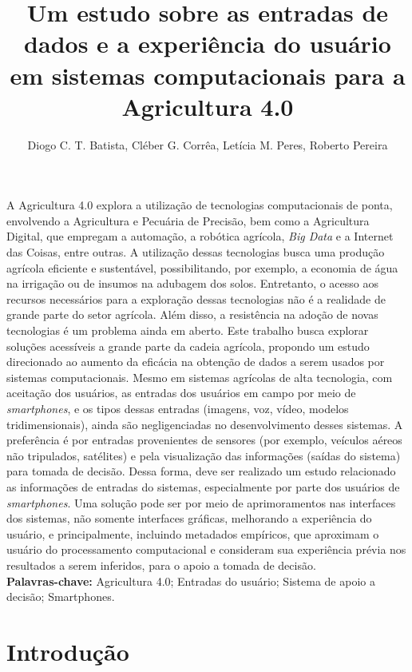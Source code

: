 \documentclass[12pt]{article}
\title{Um estudo sobre as entradas de dados e a experiência do usuário em sistemas computacionais para a Agricultura 4.0}
\author{Diogo C. T. Batista\inst{1}, Cléber G. Corrêa\inst{1}, Letícia M. Peres\inst{2}, Roberto Pereira\inst{2}}
\begin{document}
 

\maketitle
     
\begin{resumo} 
A Agricultura 4.0 explora a utilização de tecnologias computacionais de ponta, envolvendo a Agricultura e Pecuária de Precisão, bem como a Agricultura Digital, que empregam a automação, a robótica agrícola, \textit{Big Data} e a Internet das Coisas, entre outras. A utilização dessas tecnologias busca uma produção agrícola eficiente e sustentável, possibilitando, por exemplo, a economia de água na irrigação ou de insumos na adubagem dos solos. Entretanto, o acesso aos recursos necessários para a exploração dessas tecnologias não é a realidade de grande parte do setor agrícola. Além disso, a resistência na adoção de novas tecnologias é um problema ainda em aberto. Este trabalho busca explorar soluções acessíveis a grande parte da cadeia agrícola, propondo um estudo direcionado ao aumento da eficácia na obtenção de dados a serem usados por sistemas computacionais. Mesmo em sistemas agrícolas de alta tecnologia, com aceitação dos usuários, as entradas dos usuários em campo por meio de \textit{smartphones}, e os tipos dessas entradas (imagens, voz, vídeo, modelos tridimensionais), ainda são negligenciadas no desenvolvimento desses sistemas. A preferência é por entradas provenientes de sensores (por exemplo, veículos aéreos não tripulados, satélites) e pela visualização das informações (saídas do sistema) para tomada de decisão. Dessa forma, deve ser realizado um estudo relacionado as informações de entradas do sistemas, especialmente por parte dos usuários de \textit{smartphones}. Uma solução pode ser por meio de aprimoramentos nas interfaces dos sistemas, não somente interfaces gráficas, melhorando a experiência do usuário, e principalmente, incluindo metadados empíricos, que aproximam o usuário do processamento computacional e consideram sua experiência prévia nos resultados a serem inferidos, para o apoio a tomada de decisão.\\
\textbf{Palavras-chave:} Agricultura 4.0; Entradas do usuário; Sistema de apoio a decisão; Smartphones.
\end{resumo}

\section{Introdução}
\label{sec:introducao}
\end{document}
